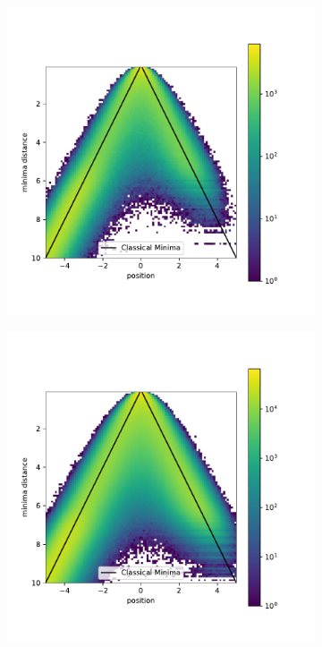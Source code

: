 \documentclass{scrartcl}
\begin{document}
		\begin{figure}[H]
			\centering
				\begin{subfigure}[c]{0.49\textwidth}
					\includegraphics[width=\textwidth]{../imgs/anharmonic_oscillator_lambda_parameter/track_10001000_lambda_parameter.pdf}
					\label{fig:track_10001000_lambda_parameter}
				\end{subfigure}
				\begin{subfigure}[c]{0.49\textwidth}
					\includegraphics[width=\textwidth]{../imgs/anharmonic_oscillator_lambda_parameter/track_100001000_lambda_parameter.pdf}

\end{subfigure}
\end{figure}
\end{document}
